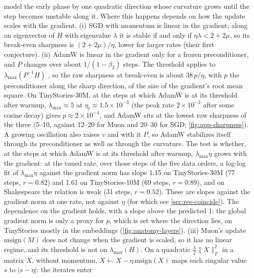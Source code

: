 \documentclass[10pt]{article}
\makeatletter
\renewcommand\paragraph{\@startsection{paragraph}{4}{\z@}{1.2ex \@plus .4ex \@minus .2ex}{-1em}{\normalfont\normalsize\bfseries}}
\newcommand{\lmax}{\lambda_{\max}}
\makeatother
\begin{document}
\paragraph{Break-even points by optimizer.} \citet{jastrzebski2020breakeven} model the early phase by one
quadratic direction whose curvature grows until the step becomes unstable along it. Where this happens depends
on how the update scales with the gradient.
(i) SGD with momentum is linear in the gradient; along an eigenvector of $H$ with eigenvalue $\lambda$ it is
stable if and only if $\eta\lambda<2+2\mu$, so its break-even sharpness is $(2+2\mu)/\eta$, lower for larger
rates (their first conjecture).
(ii) AdamW is linear in the gradient only for a frozen preconditioner, and $P$ changes over about
$1/(1-\beta_2)$ steps. The threshold applies to $\lmax(P^{-1}H)$ \citep{cohen2022adaptive}, so the raw sharpness at
break-even is about $38\,p/\eta$, with $p$ the preconditioner along the sharp direction, of the size of the
gradient's root mean square. On TinyStories-30M, at the steps at which AdamW is at its threshold after warmup,
$\lmax\approx5$ at $\eta_t\approx1.5\times10^{-3}$ (the peak rate $2\times10^{-3}$ after some cosine decay) gives
$p\approx2\times10^{-4}$,
and AdamW sits at the lowest raw sharpness of the three (5--10, against 12--20 for Muon and 20--30 for SGD;
\cref{fig:app-sharpness}). A growing oscillation also raises $v$ and with it $P$, so AdamW stabilizes itself
through its preconditioner as well as through the curvature. The test is whether, at the steps at which AdamW
is at its threshold after warmup, $\lmax\eta$ grows with the gradient: at the tuned rate, over those steps of
the five data orders, a log-log fit of $\lmax\eta$ against the gradient norm has slope 1.15 on TinyStories-30M
(77 steps, $r=0.82$) and 1.61 on TinyStories-10M (69 steps, $r=0.89$), and on Shakespeare the relation is weak
(31 steps, $r=0.52$). These are slopes against the gradient norm at one rate, not against $\eta$ (for which see
\cref{sec:res-coincide}). The dependence on the gradient holds, with a slope above the predicted 1: the global gradient norm is only a proxy for $p$, which is set where
the direction lies, on TinyStories mostly in the embeddings (\cref{fig:anatomy-layers}).
(iii) Muon's update $\mathrm{msign}(M)$ does not change when the gradient is scaled, so it has no linear regime,
and its threshold is not on $\lmax(H)$. On a quadratic $\frac\lambda2\|X\|_F^2$ in a matrix $X$, without
momentum, $X\leftarrow X-\eta\,\mathrm{msign}(X)$ maps each singular value $s$ to $|s-\eta|$: the iterates enter
\end{document}
